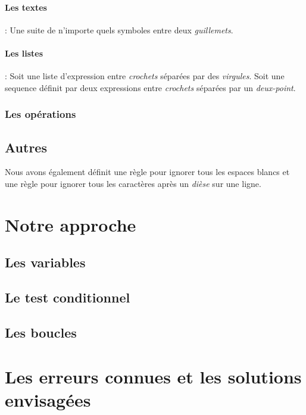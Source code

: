 \paragraph{Les textes}: Une suite de n'importe quels symboles entre deux \textit{guillemets}.

\paragraph{Les listes}: Soit une liste d'expression entre \textit{crochets} séparées par des \textit{virgules}. Soit une sequence définit par deux expressions entre \textit{crochets} séparées par un \textit{deux-point}.

\subsubsection{Les opérations}

\subsection{Autres}
Nous avons également définit une règle pour ignorer tous les espaces blancs et une règle pour ignorer tous les caractères après un \textit{dièse} sur une ligne.

\section{Notre approche}
\subsection{Les variables}

\subsection{Le test conditionnel}

\subsection{Les boucles}

\section{Les erreurs connues et les solutions envisagées}
